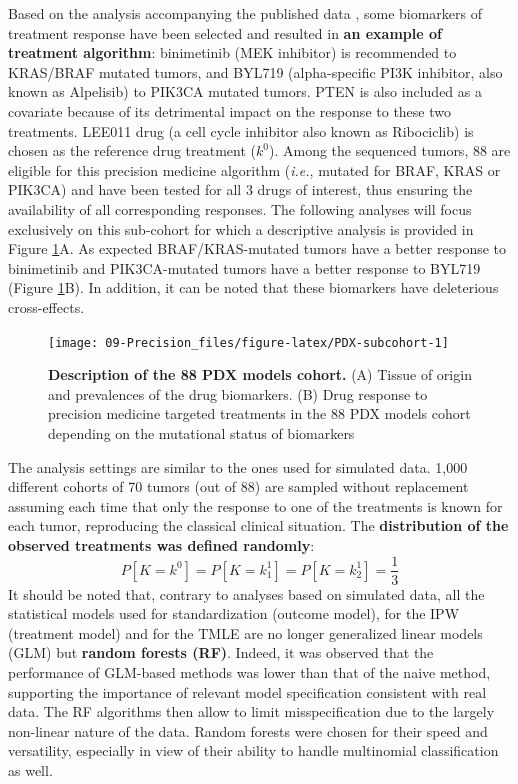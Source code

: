 \documentclass[a4paper,12pt,twoside,onecolumn,openright,final,oldfontcommands]{memoir}
\begin{document}
Based on the analysis accompanying the published data
\citep{gao2015high}, some biomarkers of treatment response have been
selected and resulted in \textbf{an example of treatment algorithm}:
binimetinib (MEK inhibitor) is recommended to KRAS/BRAF mutated tumors,
and BYL719 (alpha-specific PI3K inhibitor, also known as Alpelisib) to
PIK3CA mutated tumors. PTEN is also included as a covariate because of
its detrimental impact on the response to these two treatments. LEE011
drug (a cell cycle inhibitor also known as Ribociclib) is chosen as the
reference drug treatment (\(k^0\)). Among the sequenced tumors, 88 are
eligible for this precision medicine algorithm (\emph{i.e.}, mutated for
BRAF, KRAS or PIK3CA) and have been tested for all 3 drugs of interest,
thus ensuring the availability of all corresponding responses. The
following analyses will focus exclusively on this sub-cohort for which a
descriptive analysis is provided in Figure \ref{fig:PDX-subcohort}A. As
expected BRAF/KRAS-mutated tumors have a better response to binimetinib
and PIK3CA-mutated tumors have a better response to BYL719 (Figure
\ref{fig:PDX-subcohort}B). In addition, it can be noted that these
biomarkers have deleterious cross-effects.

\begin{figure}

{\centering \texttt{[image: 09-Precision\_files/figure-latex/PDX-subcohort-1]} 

}

\caption[Description of the 88 PDX models cohort]{\textbf{Description of the 88 PDX models
cohort.} (A) Tissue of origin and prevalences of the drug biomarkers.
(B) Drug response to precision medicine targeted treatments in the 88
PDX models cohort depending on the mutational status of biomarkers}\label{fig:PDX-subcohort}
\end{figure}






The analysis settings are similar to the ones used for simulated data.
1,000 different cohorts of 70 tumors (out of 88) are sampled without
replacement assuming each time that only the response to one of the
treatments is known for each tumor, reproducing the classical clinical
situation. The \textbf{distribution of the observed treatments was
defined randomly}: \[P[K=k^0]=P[K=k^1_1]=P[K=k^1_2]=\dfrac{1}{3}\] It
should be noted that, contrary to analyses based on simulated data, all
the statistical models used for standardization (outcome model), for the
IPW (treatment model) and for the TMLE are no longer generalized linear
models (GLM) but \textbf{random forests (RF)}. Indeed, it was observed
that the performance of GLM-based methods was lower than that of the
naive method, supporting the importance of relevant model specification
consistent with real data. The RF algorithms then allow to limit
misspecification due to the largely non-linear nature of the data.
Random forests were chosen for their speed and versatility, especially
in view of their ability to handle multinomial classification as well.
\end{document}
